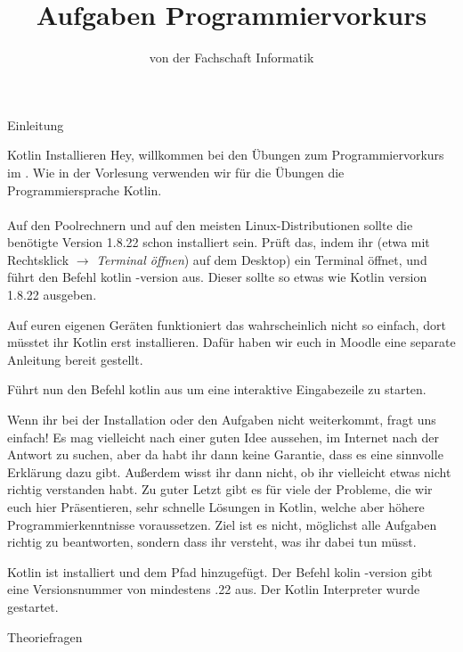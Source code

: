 
\title{Aufgaben Programmiervorkurs}
\subtitle{von der Fachschaft Informatik\hfill\ptitle}

\maketitle{}

\begin{task}[points=auto]{Einleitung}
    \begin{subtask*}[points=0]{Kotlin Installieren}
        Hey, willkommen bei den Übungen zum Programmiervorkurs im \ptitle. Wie in der
        Vorlesung verwenden wir für die Übungen die Programmiersprache Kotlin. \\\\
        Auf den Poolrechnern und auf den meisten Linux-Distributionen sollte die
        benötigte Version 1.8.22 schon installiert sein. Prüft das, indem ihr (etwa mit
        Rechtsklick $\to$ \textit{Terminal öffnen}) auf dem Desktop) ein Terminal öffnet,
        und führt den Befehl {\ttfamily kotlin -version} aus. Dieser sollte so etwas wie
        {\ttfamily Kotlin version 1.8.22} ausgeben.

        Auf euren eigenen Geräten funktioniert das wahrscheinlich nicht so einfach, dort müsstet ihr Kotlin erst installieren.
        Dafür haben wir euch in Moodle eine separate Anleitung bereit gestellt.

        Führt nun den Befehl {\ttfamily kotlin} aus um eine interaktive Eingabezeile zu starten.

        Wenn ihr bei der Installation oder den Aufgaben nicht weiterkommt, fragt uns einfach! Es mag vielleicht nach einer guten Idee aussehen, im Internet nach der Antwort zu suchen, aber da habt ihr dann keine Garantie, dass es eine sinnvolle Erklärung dazu gibt. Außerdem wisst ihr dann nicht, ob ihr vielleicht etwas nicht richtig verstanden habt. Zu guter Letzt gibt es für viele der Probleme, die wir euch hier Präsentieren, sehr schnelle Lösungen in Kotlin, welche aber höhere Programmierkenntnisse voraussetzen. Ziel ist es nicht, möglichst alle Aufgaben richtig zu beantworten, sondern dass ihr versteht, was ihr dabei tun müsst.
        \begin{solution}
            Kotlin ist installiert und dem Pfad hinzugefügt. Der Befehl
            {\ttfamily kolin -version} gibt eine Versionsnummer von mindestens {.22} aus.
            Der Kotlin Interpreter wurde gestartet.
        \end{solution}
    \end{subtask*}
    \begin{subtask*}[points=0]{Theoriefragen}

\end{subtask*}
\end{task}
